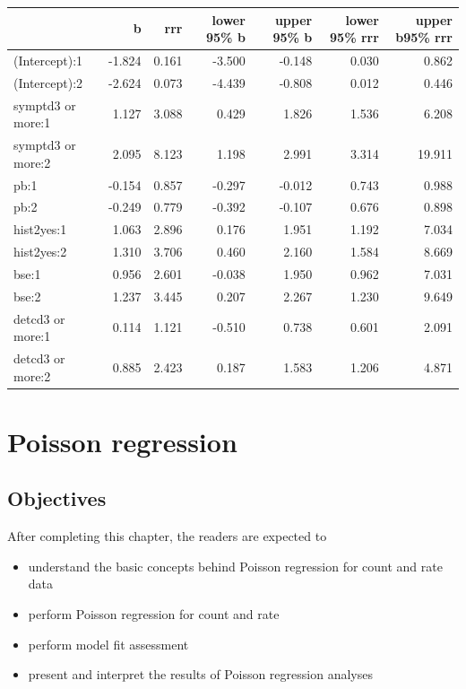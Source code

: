 \documentclass[
  10pt,
]{krantz}
\providecommand{\tightlist}{%
  \setlength{\itemsep}{0pt}\setlength{\parskip}{0pt}}
\begin{document}
\begin{table}
\centering
\begin{tabular}{l|r|r|r|r|r|r}
\hline
  & b & rrr & lower 95\% b & upper 95\% b & lower 95\% rrr & upper b95\% rrr\\
\hline
(Intercept):1 & -1.824 & 0.161 & -3.500 & -0.148 & 0.030 & 0.862\\
\hline
(Intercept):2 & -2.624 & 0.073 & -4.439 & -0.808 & 0.012 & 0.446\\
\hline
symptd3 or more:1 & 1.127 & 3.088 & 0.429 & 1.826 & 1.536 & 6.208\\
\hline
symptd3 or more:2 & 2.095 & 8.123 & 1.198 & 2.991 & 3.314 & 19.911\\
\hline
pb:1 & -0.154 & 0.857 & -0.297 & -0.012 & 0.743 & 0.988\\
\hline
pb:2 & -0.249 & 0.779 & -0.392 & -0.107 & 0.676 & 0.898\\
\hline
hist2yes:1 & 1.063 & 2.896 & 0.176 & 1.951 & 1.192 & 7.034\\
\hline
hist2yes:2 & 1.310 & 3.706 & 0.460 & 2.160 & 1.584 & 8.669\\
\hline
bse:1 & 0.956 & 2.601 & -0.038 & 1.950 & 0.962 & 7.031\\
\hline
bse:2 & 1.237 & 3.445 & 0.207 & 2.267 & 1.230 & 9.649\\
\hline
detcd3 or more:1 & 0.114 & 1.121 & -0.510 & 0.738 & 0.601 & 2.091\\
\hline
detcd3 or more:2 & 0.885 & 2.423 & 0.187 & 1.583 & 1.206 & 4.871\\
\hline
\end{tabular}
\end{table}

\hypertarget{poisson-regression}{%
\chapter{\texorpdfstring{Poisson regression}{Poisson regression}}\label{poisson-regression}}

\hypertarget{objectives-8}{%
\section{Objectives}\label{objectives-8}}

After completing this chapter, the readers are expected to

\begin{itemize}
\tightlist
\item
  understand the basic concepts behind Poisson regression for count and rate data
\item
  perform Poisson regression for count and rate
\item
  perform model fit assessment
\item
  present and interpret the results of Poisson regression analyses
\end{itemize}
\end{document}

